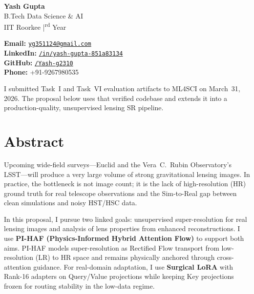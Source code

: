 \documentclass[11pt,a4paper]{article}
\begin{document}
\begin{tcolorbox}[
  enhanced, breakable,
  colback=navyblue, colframe=navyblue,
  arc=6pt, boxrule=0pt,
  left=10pt, right=10pt, top=10pt, bottom=10pt
]
\begin{minipage}[t]{0.49\textwidth}
  {\Large\bfseries\color{white} Yash Gupta}\\[3pt]
  {\small\color{white!75} B.Tech Data Science \& AI}\\[2pt]
  {\small\color{white!75} IIT Roorkee \quad|\textsuperscript{rd} Year}
\end{minipage}%
\hfill
\begin{minipage}[t]{0.49\textwidth}
  {\small\color{white!85}
    \textbf{Email:} \href{mailto:yg351124@gmail.com}{\texttt{yg351124@gmail.com}}\\[2pt]
    \textbf{LinkedIn:} \href{https://www.linkedin.com/in/yash-gupta-851a83134/}{\texttt{/in/yash-gupta-851a83134}}\\[2pt]
    \textbf{GitHub:} \href{https://github.com/Yash-g2310}{\texttt{/Yash-g2310}}\\[2pt]
    \textbf{Phone:} +91-9267980535
  }
\end{minipage}
\end{tcolorbox}

\begin{notebox}
\small I submitted Task~I and Task~VI evaluation artifacts to ML4SCI on March~31, 2026. The proposal below uses that verified codebase and extends it into a production-quality, unsupervised lensing SR pipeline.
\end{notebox}

\vspace{6pt}

\section{Abstract}

Upcoming wide-field surveys---Euclid and the Vera~C.\ Rubin Observatory's LSST---will produce a very large volume of strong gravitational lensing images. In practice, the bottleneck is not image count; it is the lack of high-resolution (HR) ground truth for real telescope observations and the Sim-to-Real gap between clean simulations and noisy HST/HSC data.

In this proposal, I pursue two linked goals: unsupervised super-resolution for real lensing images and analysis of lens properties from enhanced reconstructions. I use \textbf{PI-HAF (Physics-Informed Hybrid Attention Flow)} to support both aims. PI-HAF models super-resolution as Rectified Flow transport from low-resolution (LR) to HR space and remains physically anchored through cross-attention guidance. For real-domain adaptation, I use \textbf{Surgical LoRA} with Rank-16 adapters on Query/Value projections while keeping Key projections frozen for routing stability in the low-data regime.
\end{document}
